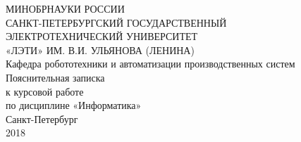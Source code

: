 \documentclass[russian,utf8,nocolumnxxxi,nocolumnxxxii]{eskdtext}
\begin{document}
\begin{center}
МИНОБРНАУКИ РОССИИ
\\САНКТ-ПЕТЕРБУРГСКИЙ ГОСУДАРСТВЕННЫЙ
\\ЭЛЕКТРОТЕХНИЧЕСКИЙ УНИВЕРСИТЕТ
\\«ЛЭТИ» ИМ. В.И. УЛЬЯНОВА (ЛЕНИНА)
\\Кафедра робототехники и автоматизации производственных систем
\vspace{30ex}
\\Пояснительная записка
\\к курсовой работе
\\по дисциплине «Информатика»
\vspace{40ex}
\\Санкт-Петербург
\\2018
\end{center}
\end{document}
